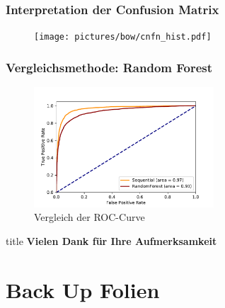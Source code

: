 \documentclass[aspectratio=1610, professionalfonts, 9pt]{beamer}
\begin{document}
  \begin{frame}
    \frametitle{Interpretation der Confusion Matrix}
    \begin{figure}
      \texttt{[image: pictures/bow/cnfn\_hist.pdf]}
      \label{}
    \end{figure}
  \end{frame}

  \begin{frame}
    \frametitle{Vergleichsmethode: Random Forest}
    \begin{figure}
      \includegraphics[width=0.6\textwidth]{pictures/bow/roc_comparison.pdf}
      \caption{Vergleich der ROC-Curve}
      \label{}
    \end{figure}
  \end{frame}

  \begin{frame}
    \vfill
    \centering
    \begin{beamercolorbox}[sep=8pt,center,shadow=false,rounded=true]{title}
      \huge{\textbf{Vielen Dank für Ihre Aufmerksamkeit}}
    \end{beamercolorbox}
  \end{frame}

\section{Back Up Folien}
\end{document}
